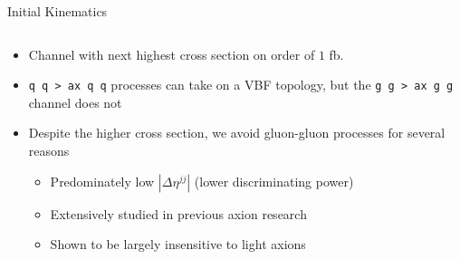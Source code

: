 \documentclass[]{beamer}
\begin{document}
\begin{frame}{Initial Kinematics}
\begin{columns}
\begin{column}{0.5\linewidth}
\begin{block}
\begin{itemize}[<+(1)->]
                    \item Channel with next highest cross section on order of $1$ fb.
                    \item \texttt{q q > ax q q} processes can take on a VBF topology, but the \texttt{g g > ax g g} channel does not
                    \item Despite the higher cross section, we avoid gluon-gluon processes for several reasons
                    \begin{itemize}[<+(1)->]
                        \item Predominately low $|\Delta \eta^{jj}|$ (lower discriminating power)
                        \item Extensively studied in previous axion research
                        \item Shown to be largely insensitive to light axions
                    \end{itemize}
                \end{itemize}
            \end{block}
        \end{column}
    \end{columns}
\end{frame}
\end{document}

